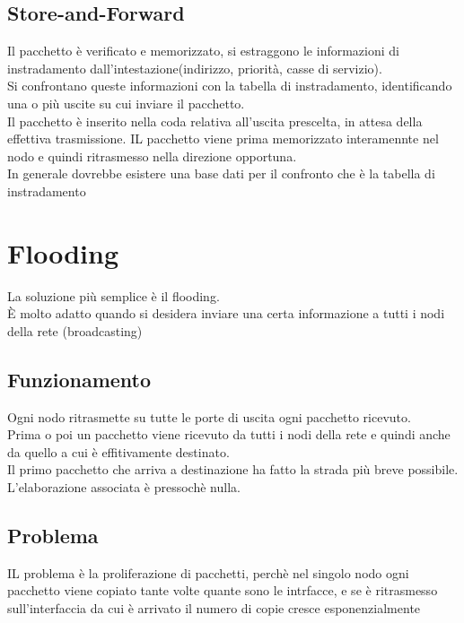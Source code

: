 \documentclass{report}
\begin{document}
            \subsection{Store-and-Forward}
                Il pacchetto è verificato e memorizzato, si estraggono le informazioni di instradamento dall'intestazione(indirizzo, priorità, casse di servizio).
                \\
                Si confrontano queste informazioni con la tabella di instradamento, identificando una o più uscite su cui inviare il pacchetto.
                \\
                Il pacchetto è inserito nella coda relativa all'uscita prescelta, in attesa della effettiva trasmissione. IL pacchetto viene prima memorizzato interamennte nel nodo e quindi ritrasmesso nella direzione opportuna.
                \\
                In generale dovrebbe esistere una base dati per il confronto che è la tabella di instradamento
        \section{Flooding}
            La soluzione più semplice è il flooding.
            \\
            È molto adatto quando si desidera inviare una certa informazione a tutti i nodi della rete (broadcasting)
            \subsection{Funzionamento}
                Ogni nodo ritrasmette su tutte le porte di uscita ogni pacchetto ricevuto.
                \\
                Prima o poi un pacchetto viene ricevuto da tutti i nodi della rete e quindi anche da quello a cui è effitivamente destinato.
                \\
                Il primo pacchetto che arriva a destinazione ha fatto la strada più breve possibile.
                \\
                L'elaborazione associata è pressochè nulla.
            \subsection{Problema}
                IL problema è la proliferazione di pacchetti, perchè nel singolo nodo ogni pacchetto viene copiato tante volte quante sono le intrfacce, e se è ritrasmesso sull'interfaccia da cui è arrivato il numero di copie cresce esponenzialmente
\end{document}
